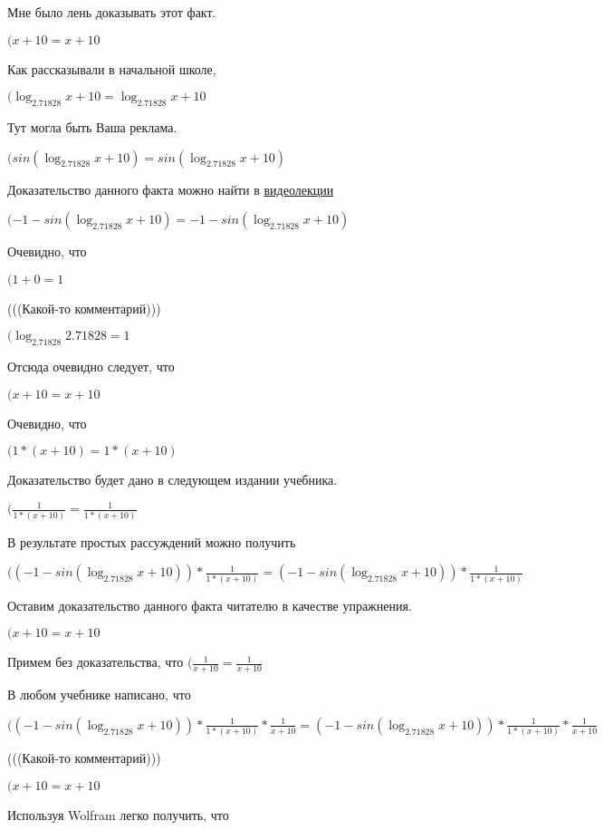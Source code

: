 \documentclass[12pt,a4paper,fleqn]{article}
\theoremstyle{definition}
\begin{document}
Мне было лень доказывать этот факт.

$( x  +  10  =  x  +  10 $

Как рассказывали в начальной школе,

$(\log_{ 2.71828 }{ x  +  10 } = \log_{ 2.71828 }{ x  +  10 }$

Тут могла быть Ваша реклама.

$(sin(\log_{ 2.71828 }{ x  +  10 }) = sin(\log_{ 2.71828 }{ x  +  10 })$

Доказательство данного факта можно найти в \href{https://www.youtube.com/watch?v=dQw4w9WgXcQ}{видеолекции}

$( -1  - sin(\log_{ 2.71828 }{ x  +  10 }) =  -1  - sin(\log_{ 2.71828 }{ x  +  10 })$

Очевидно, что

$( 1  +  0  =  1 $

(((Какой-то комментарий)))

$(\log_{ 2.71828 }{ 2.71828 } =  1 $

Отсюда очевидно следует, что

$( x  +  10  =  x  +  10 $

Очевидно, что

$( 1  * ( x  +  10 ) =  1  * ( x  +  10 )$

Доказательство будет дано в следующем издании учебника.

$(\frac{ 1 }{ 1  * ( x  +  10 )}
 = \frac{ 1 }{ 1  * ( x  +  10 )}
$

В результате простых рассуждений можно получить

$(( -1  - sin(\log_{ 2.71828 }{ x  +  10 })) * \frac{ 1 }{ 1  * ( x  +  10 )}
 = ( -1  - sin(\log_{ 2.71828 }{ x  +  10 })) * \frac{ 1 }{ 1  * ( x  +  10 )}
$

Оставим доказательство данного факта читателю в качестве упражнения.

$( x  +  10  =  x  +  10 $

Примем без доказательства, что
$(\frac{ 1 }{ x  +  10 }
 = \frac{ 1 }{ x  +  10 }
$

В любом учебнике написано, что

$(( -1  - sin(\log_{ 2.71828 }{ x  +  10 })) * \frac{ 1 }{ 1  * ( x  +  10 )}
 * \frac{ 1 }{ x  +  10 }
 = ( -1  - sin(\log_{ 2.71828 }{ x  +  10 })) * \frac{ 1 }{ 1  * ( x  +  10 )}
 * \frac{ 1 }{ x  +  10 }
$

(((Какой-то комментарий)))

$( x  +  10  =  x  +  10 $

Используя Wolfram легко получить, что
\end{document}
